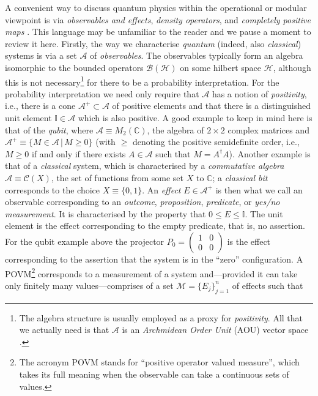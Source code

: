 \documentclass[11pt]{amsart}
\theoremstyle{plain}%
\theoremstyle{definition}
\theoremstyle{remark}
\begin{document}
A convenient way to discuss quantum physics within the operational or modular viewpoint is via \emph{observables and effects}, \emph{density operators}, and \emph{completely positive maps} \cite{ludwig_foundations_1983,davies_quantum_1976}. This language may be unfamiliar to the reader and we pause a moment to review it here. Firstly, the way we characterise \emph{quantum} (indeed, also \emph{classical}) systems is via a set $\mathcal{A}$ of \emph{observables}. The observables typically form an algebra isomorphic to the bounded operators $\mathcal{B}(\mathcal{H})$ on some hilbert space $\mathcal{H}$, although this is not necessary\footnote{The algebra structure is usually employed as a proxy for \emph{positivity}. All that we actually need is that $\mathcal{A}$ is an \emph{Archmidean Order Unit} (AOU) vector space \cite{paulsen_vector_2009,kleinmann_typical_2013}.} for there to be a probability interpretation. For the probability interpretation we need only require that $\mathcal{A}$ has a notion of \emph{positivity}, i.e., there is a cone $\mathcal{A}^+ \subset \mathcal{A}$ of positive elements and that there is a distinguished unit element $\mathbb{I}\in\mathcal{A}$ which is also positive. A good example to keep in mind here is that of the \emph{qubit}, where $\mathcal{A}\equiv M_2(\mathbb{C})$, the algebra of $2\times 2$ complex matrices and $\mathcal{A}^+ \equiv \{M\in \mathcal{A}\,|\, M\ge 0\}$ (with $\ge$ denoting the positive semidefinite order, i.e., $M\ge 0$ if and only if there exists $A\in \mathcal{A}$ such that $M = A^\dag A$). Another example is that of a \emph{classical} system, which is characterised by a \emph{commutative algebra} $\mathcal{A}\equiv \mathcal{C}(X)$, the set of functions from some set $X$ to $\mathbb{C}$; a \emph{classical bit} corresponds to the choice $X \equiv \{0,1\}$. An \emph{effect} $E\in\mathcal{A}^+$ is then what we call an observable corresponding to an \emph{outcome}, \emph{proposition}, \emph{predicate}, or \emph{yes/no measurement}. It is characterised by the property that $0\le E\le \mathbb{I}$. The unit element is the effect corresponding to the empty predicate, that is, no assertion. For the qubit example above the projector $P_0 = \left(\begin{smallmatrix} 1 & 0 \\ 0 & 0\end{smallmatrix}\right)$ is the effect corresponding to the assertion that the system is in the ``zero'' configuration. A POVM\footnote{The acronym POVM stands for ``positive operator valued measure'', which takes its full meaning when the observable can take a continuous sets of values. } corresponds to a measurement of a system and---provided it can take only finitely many values---comprises of a set $\mathcal{M} = \{E_j\}_{j=1}^n$ of effects such that 
\end{document}
